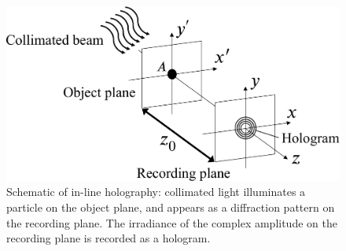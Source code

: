 \begin{figure}[htbp]
    \centering
    \includegraphics[width=0.8\linewidth]{./Figure/2_Theory/inline_holography.pdf}
    \caption{Schematic of in-line holography: collimated light illuminates a particle on the object plane, and appears as a diffraction pattern  on the recording plane. The irradiance of the complex amplitude on the recording plane is recorded as a hologram.}
    \label{fig:in-lineHolography}
\end{figure}


